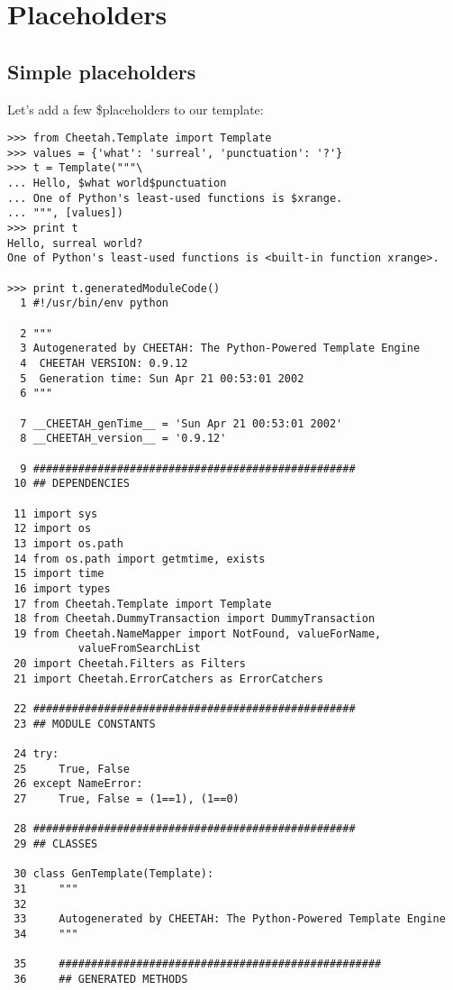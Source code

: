 \section{Placeholders}
\label{placeholders}

\subsection{Simple placeholders}
\label{placeholders.simple}

Let's add a few \$placeholders to our template:

\begin{verbatim}
>>> from Cheetah.Template import Template
>>> values = {'what': 'surreal', 'punctuation': '?'}
>>> t = Template("""\
... Hello, $what world$punctuation
... One of Python's least-used functions is $xrange.
... """, [values])
>>> print t
Hello, surreal world?
One of Python's least-used functions is <built-in function xrange>.

>>> print t.generatedModuleCode()
  1	#!/usr/bin/env python
    
  2	"""
  3	Autogenerated by CHEETAH: The Python-Powered Template Engine
  4	 CHEETAH VERSION: 0.9.12
  5	 Generation time: Sun Apr 21 00:53:01 2002
  6	"""
    
  7	__CHEETAH_genTime__ = 'Sun Apr 21 00:53:01 2002'
  8	__CHEETAH_version__ = '0.9.12'
    
  9	##################################################
 10	## DEPENDENCIES
    
 11	import sys
 12	import os
 13	import os.path
 14	from os.path import getmtime, exists
 15	import time
 16	import types
 17	from Cheetah.Template import Template
 18	from Cheetah.DummyTransaction import DummyTransaction
 19	from Cheetah.NameMapper import NotFound, valueForName, 
           valueFromSearchList
 20	import Cheetah.Filters as Filters
 21	import Cheetah.ErrorCatchers as ErrorCatchers
    
 22	##################################################
 23	## MODULE CONSTANTS
    
 24	try:
 25	    True, False
 26	except NameError:
 27	    True, False = (1==1), (1==0)
    
 28	##################################################
 29	## CLASSES
    
 30	class GenTemplate(Template):
 31	    """
 32	    
 33	    Autogenerated by CHEETAH: The Python-Powered Template Engine
 34	    """
    
 35	    ##################################################
 36	    ## GENERATED METHODS
    
\end{verbatim}
